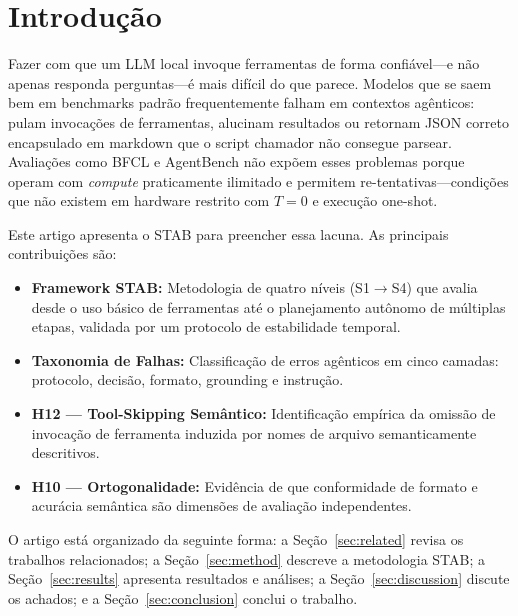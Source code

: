 \documentclass{kdmile}
\begin{document}
\section{Introdução}
\label{sec:intro}

Fazer com que um LLM local invoque ferramentas de forma confiável—\allowbreak e não apenas
responda perguntas—\allowbreak é mais difícil do que parece.
Modelos que se saem bem em benchmarks padrão frequentemente falham em contextos
agênticos: pulam invocações de ferramentas, alucinam resultados ou retornam JSON
correto encapsulado em markdown que o script chamador não consegue parsear.
Avaliações como BFCL e AgentBench não expõem esses problemas porque operam com
\textit{compute} praticamente ilimitado e permitem re-tentativas—\allowbreak condições que
não existem em hardware restrito com $T=0$ e execução one-shot.

Este artigo apresenta o STAB para preencher essa lacuna. As principais contribuições são:

\begin{itemize}
  \item \textbf{Framework STAB:} Metodologia de quatro níveis (S1$\rightarrow$S4)
        que avalia desde o uso básico de ferramentas até o planejamento autônomo
        de múltiplas etapas, validada por um protocolo de estabilidade temporal.

  \item \textbf{Taxonomia de Falhas:} Classificação de erros agênticos em cinco
        camadas: protocolo, decisão, formato, grounding e instrução.

  \item \textbf{H12 — Tool-Skipping Semântico:} Identificação empírica da
        omissão de invocação de ferramenta induzida por nomes de arquivo
        semanticamente descritivos.

  \item \textbf{H10 — Ortogonalidade:} Evidência de que conformidade de formato
        e acurácia semântica são dimensões de avaliação independentes.
\end{itemize}

O artigo está organizado da seguinte forma: a Seção~\ref{sec:related} revisa os
trabalhos relacionados; a Seção~\ref{sec:method} descreve a metodologia STAB;
a Seção~\ref{sec:results} apresenta resultados e análises; a
Seção~\ref{sec:discussion} discute os achados; e a Seção~\ref{sec:conclusion}
conclui o trabalho.
\end{document}
